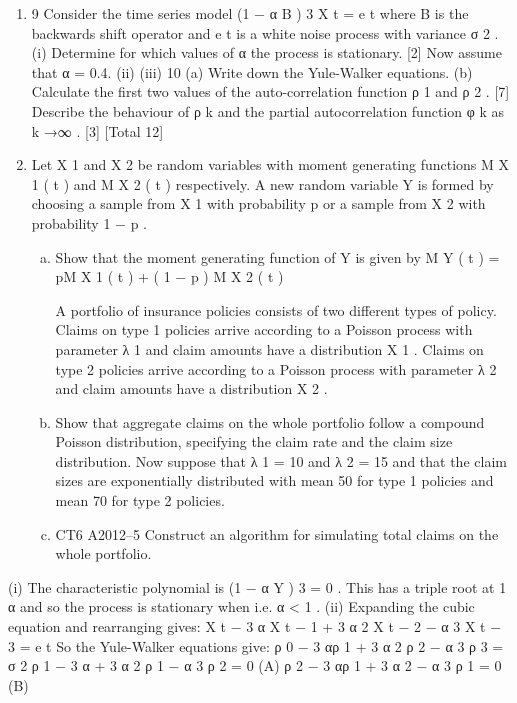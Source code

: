 \documentclass[a4paper,12pt]{article}
\begin{document}
\begin{enumerate}
\item 9
Consider the time series model
(1 − α B ) 3 X t = e t
where B is the backwards shift operator and e t is a white noise process with variance
σ 2 .
(i)
Determine for which values of α the process is stationary.
[2]
Now assume that α = 0.4.
(ii)
(iii)
10
(a) Write down the Yule-Walker equations.
(b) Calculate the first two values of the auto-correlation function ρ 1 and
ρ 2 .
[7]
Describe the behaviour of ρ k and the partial autocorrelation function φ k as
k →∞ .
[3]
[Total 12]
\item Let X 1 and X 2 be random variables with moment generating functions M X 1 ( t ) and
M X 2 ( t ) respectively. A new random variable Y is formed by choosing a sample
from X 1 with probability p or a sample from X 2 with probability 1 − p .
\begin{enumerate}[(a)]
\item 
Show that the moment generating function of Y is given by
M Y ( t ) = pM X 1 ( t ) + ( 1 − p ) M X 2 ( t )

A portfolio of insurance policies consists of two different types of policy. Claims on
type 1 policies arrive according to a Poisson process with parameter λ 1 and claim
amounts have a distribution X 1 . Claims on type 2 policies arrive according to a
Poisson process with parameter λ 2 and claim amounts have a distribution X 2 .
\item 
Show that aggregate claims on the whole portfolio follow a compound Poisson
distribution, specifying the claim rate and the claim size distribution.
Now suppose that λ 1 = 10 and λ 2 = 15 and that the claim sizes are exponentially
distributed with mean 50 for type 1 policies and mean 70 for type 2 policies.
\item 
CT6 A2012–5
Construct an algorithm for simulating total claims on the whole portfolio. 
\end{enumerate}
\end{enumerate}
(i)
The characteristic polynomial is (1 − α Y ) 3 = 0 .
This has a triple root at 1
α
and so the process is stationary when
i.e. α < 1 .
(ii)
Expanding the cubic equation and rearranging gives:
X t − 3 α X t − 1 + 3 α 2 X t − 2 − α 3 X t − 3 = e t
So the Yule-Walker equations give:
ρ 0 − 3 αρ 1 + 3 α 2 ρ 2 − α 3 ρ 3 = σ 2
ρ 1 − 3 α + 3 α 2 ρ 1 − α 3 ρ 2 = 0 (A)
ρ 2 − 3 αρ 1 + 3 α 2 − α 3 ρ 1 = 0 (B)
\end{document}
